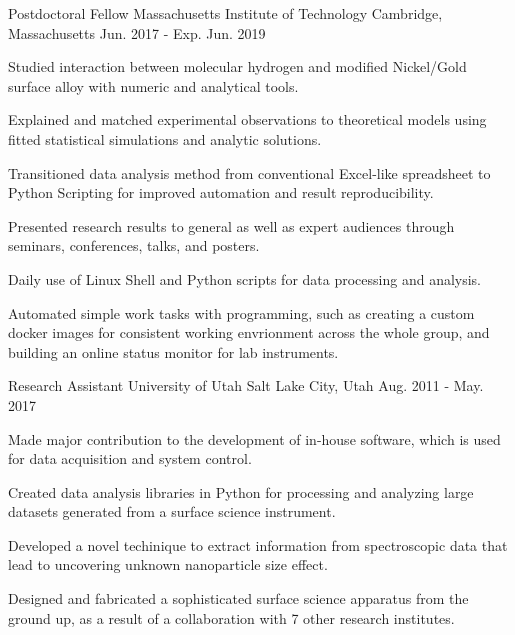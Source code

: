 


\begin{cventries}


\cventry
{Postdoctoral Fellow}
{Massachusetts Institute of Technology}
{Cambridge, Massachusetts}
{Jun. 2017 - Exp. Jun. 2019}
{
\begin{cvitems}
\item {Studied interaction between molecular hydrogen and modified Nickel/Gold
    surface alloy with numeric and analytical tools.}
\item {Explained and matched experimental observations to theoretical models
    using fitted statistical simulations and analytic solutions.}
\item {Transitioned data analysis method from conventional Excel-like
    spreadsheet to Python Scripting for improved automation and result
    reproducibility.}
\item {Presented research results to general as well as expert audiences
    through seminars, conferences, talks, and posters.}
\item {Daily use of Linux Shell and Python scripts for data processing and analysis.}
\item {Automated simple work tasks with programming, such as creating a custom
    docker images for consistent working envrionment across the whole group, and
    building an online status monitor for lab instruments.}
\end{cvitems}
}


\cventry
{Research Assistant}
{University of Utah}
{Salt Lake City, Utah}
{Aug. 2011 - May. 2017}
{
\begin{cvitems}
\item {Made major contribution to the development of in-house software, which is used
    for data acquisition and system control.}
\item {Created data analysis libraries in Python for processing and analyzing
    large datasets generated from a surface science instrument.}
\item {Developed a novel techinique to extract information from spectroscopic
    data that lead to uncovering unknown nanoparticle size effect.}
\item {Designed and fabricated a sophisticated surface science apparatus from
    the ground up, as a result of a collaboration with 7 other research institutes.}
\end{cvitems}
}


\end{cventries}